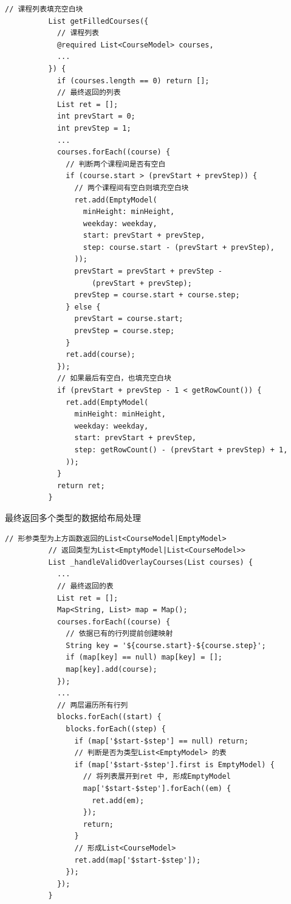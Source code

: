 \documentclass[12pt]{article}
\begin{document}
\begin{enumerate}
        \begin{lstlisting}[frame=shadowbox]
          // 课程列表填充空白块
          List getFilledCourses({
            // 课程列表
            @required List<CourseModel> courses,
            ...
          }) {
            if (courses.length == 0) return [];
            // 最终返回的列表
            List ret = [];
            int prevStart = 0;
            int prevStep = 1;
            ...
            courses.forEach((course) {
              // 判断两个课程间是否有空白
              if (course.start > (prevStart + prevStep)) {
                // 两个课程间有空白则填充空白块
                ret.add(EmptyModel(
                  minHeight: minHeight,
                  weekday: weekday,
                  start: prevStart + prevStep,
                  step: course.start - (prevStart + prevStep),
                ));
                prevStart = prevStart + prevStep -
                    (prevStart + prevStep);
                prevStep = course.start + course.step;
              } else {
                prevStart = course.start;
                prevStep = course.step;
              }
              ret.add(course);
            });
            // 如果最后有空白，也填充空白块
            if (prevStart + prevStep - 1 < getRowCount()) {
              ret.add(EmptyModel(
                minHeight: minHeight,
                weekday: weekday,
                start: prevStart + prevStep,
                step: getRowCount() - (prevStart + prevStep) + 1,
              ));
            }
            return ret;
          }
        \end{lstlisting}

        最终返回多个类型的数据给布局处理

        \begin{lstlisting}[frame=shadowbox]
          // 形参类型为上方函数返回的List<CourseModel|EmptyModel>
          // 返回类型为List<EmptyModel|List<CourseModel>>
          List _handleValidOverlayCourses(List courses) {
            ...
            // 最终返回的表
            List ret = [];
            Map<String, List> map = Map();
            courses.forEach((course) {
              // 依据已有的行列提前创建映射
              String key = '${course.start}-${course.step}';
              if (map[key] == null) map[key] = [];
              map[key].add(course);
            });
            ...
            // 两层遍历所有行列
            blocks.forEach((start) {
              blocks.forEach((step) {
                if (map['$start-$step'] == null) return;
                // 判断是否为类型List<EmptyModel> 的表
                if (map['$start-$step'].first is EmptyModel) {
                  // 将列表展开到ret 中, 形成EmptyModel
                  map['$start-$step'].forEach((em) {
                    ret.add(em);
                  });
                  return;
                }
                // 形成List<CourseModel>
                ret.add(map['$start-$step']);
              });
            });
          }
        \end{lstlisting}

    \end{enumerate}
\end{document}
